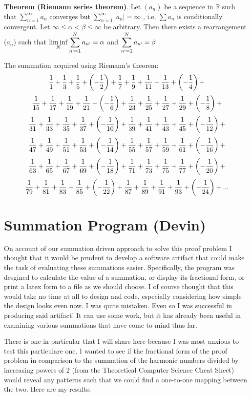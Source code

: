 \documentclass{article}
\begin{document}
{\bf Theorem (Riemann series theorem)}. Let $(a _{n})$ be a sequence in $\mathbb{R}$ such that $ \sum_{n=1}^{\infty} a _{n} $  converges but $ \sum_{n=1}^{\infty} |a _{n}| = \infty$ , i.e,  $ \sum a_{n} $ is conditionally convergent. Let $\infty \leq \alpha < \beta \leq \infty$  be arbitrary. Then there exists a rearrangement ($a _{n}$) such that $ \displaystyle\liminf_{N}   \sum_{n`=1}^{N} a _{n`} = \alpha$ and $\displaystyle\sum_{n`=1}^{N} a _{n`} = \beta$

The summation acquired using Riemann's theorem:
$${1 \over 1}+{1 \over 3}+{1 \over 5}+\left(- {1 \over 2}\right)+{1 \over 7}+{1 \over 9}+{1 \over 11}+{1 \over 13}+\left(- {1 \over 4}\right)+ $$
$${1 \over 15}+{1 \over 17}+{1 \over 19}+{1 \over 21}+\left(- {1 \over 6}\right)+{1 \over 23}+{1 \over 25}+{1 \over 27}+{1 \over 29}+\left(- {1 \over 8}\right)+ $$
$${1 \over 31}+{1 \over 33}+{1 \over 35}+{1 \over 37}+\left(- {1 \over 10}\right)+{1 \over 39}+{1 \over 41}+{1 \over 43}+{1 \over 45}+\left(- {1 \over 12}\right)+ $$
$${1 \over 47}+{1 \over 49}+{1 \over 51}+{1 \over 53}+\left(- {1 \over 14}\right)+{1 \over 55}+{1 \over 57}+{1 \over 59}+{1 \over 61}+\left(- {1 \over 16}\right)+ $$
$${1 \over 63}+{1 \over 65}+{1 \over 67}+{1 \over 69}+\left(- {1 \over 18}\right)+{1 \over 71}+{1 \over 73}+{1 \over 75}+{1 \over 77}+\left(- {1 \over 20}\right)+ $$
$${1 \over 79}+{1 \over 81}+{1 \over 83}+{1 \over 85}+\left(- {1 \over 22}\right)+{1 \over 87}+{1 \over 89}+{1 \over 91}+{1 \over 93}+\left(- {1 \over 24}\right)+ ... $$


\section{Summation Program (Devin)}
On account of our summation driven approach to solve this proof problem I thought that it would be prudent to develop a software artifact that could make 
the task of evaluating these summations easier. Specifically, the program was desgined to calculate the value of a summation, or display its fractional form,
or print a latex form to a file as we should choose. I of course thought that this would take no time at all to design and code, especially considering how simple
the design looks even now. I was quite mistaken. Even so I was successful in producing said artifact! It can use some work, but it has already been useful in 
examining various summations that have come to mind thus far.

There is one in particular that I will share here because I was most anxious to test this particulare one. I wanted to see if the fractional form of the proof
problem in comparison to the summation of the harmonic numbers divided by increasing powers of 2 (from the Theoretical Computer Science Cheat Sheet) would 
reveal any patterns such that we could find a one-to-one mapping between the two. Here are my results:
\end{document}
